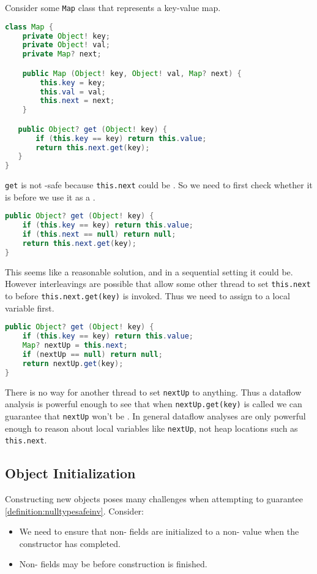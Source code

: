 \documentclass{article}
\begin{document}
\begin{example}
  Consider some \texttt{Map} class that represents a key-value map.
\begin{lstlisting}[escapechar=|, language=Java]
class Map {
    private Object! key;
    private Object! val;
    private Map? next;

    public Map (Object! key, Object! val, Map? next) {
        this.key = key;
        this.val = val;
        this.next = next;
    }

   public Object? get (Object! key) {
       if (this.key == key) return this.value;
       return this.next.get(key);
   }
}
\end{lstlisting}
  \texttt{get} is not \cringe{}-safe because \texttt{this.next} could be \cringe{}.
  So we need to first check whether it is \cringe{} before we use it as a \receiver{}.
\begin{lstlisting}[escapechar=|, language=Java]
public Object? get (Object! key) {
    if (this.key == key) return this.value;
    if (this.next == null) return null;
    return this.next.get(key);
}
\end{lstlisting}
  This seems like a reasonable solution, and in a sequential setting it could be.
  However interleavings are possible that allow some other thread to set \texttt{this.next} to \cringe{} before \texttt{this.next.get(key)} is invoked.
  Thus we need to assign to a local variable first.
\begin{lstlisting}[escapechar=|, language=Java]
public Object? get (Object! key) {
    if (this.key == key) return this.value;
    Map? nextUp = this.next;
    if (nextUp == null) return null;
    return nextUp.get(key);
}
\end{lstlisting}
  There is no way for another thread to set \texttt{nextUp} to anything.
  Thus a dataflow analysis is powerful enough to see that when \texttt{nextUp.get(key)} is called we can guarantee that \texttt{nextUp} won't be \cringe{}.
  In general dataflow analyses are only powerful enough to reason about local variables like \texttt{nextUp}, not heap locations such as \texttt{this.next}.
\end{example}

\subsection{Object Initialization}

Constructing new objects poses many challenges when attempting to guarantee \ref{definition:nulltypesafeinv}.
Consider:
\begin{itemize}
\item We need to ensure that non-\cringe{} fields are initialized to a non-\cringe{} value when the constructor has completed.
\item Non-\cringe{} fields may be \cringe{} before construction is finished.
\end{itemize}
\end{document}
